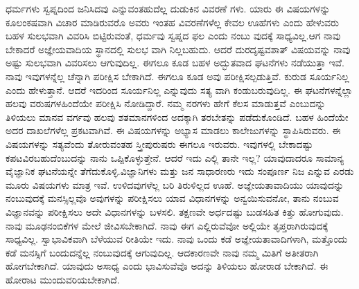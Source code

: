 ಧರ್ಮಗಳು ಸ್ವಪ್ನದಿಂದ ಜನಿಸಿದವು ಎನ್ನುವಂತಹುದೆಲ್ಲ ದುಡುಕಿನ ವಿವರಣೆ ಗಳು. ಯಾರು ಈ ವಿಷಯಗಳನ್ನು ಕೂಲಂಕಷವಾಗಿ ವಿಚಾರ ಮಾಡಿರುವರೊ ಅವರು ಇಂತಹ ವಿವರಣೆಗಳೆಲ್ಲ ಕೇವಲ ಊಹೆಗಳು ಎಂದು ಹೇಳುವರು ಬಹಳ ಸುಲಭವಾಗಿ ವಿವರಿಸಿ ಬಿಟ್ಟಿರುವಂತೆ, ಧರ್ಮವು ಸ್ವಪ್ನದ ಫಲ ಎಂದು ನಂಬು ವುದಕ್ಕೆ ಸಾಧ್ಯವಿಲ್ಲ.ಆಗ ನಾವು ಬೇಕಾದರೆ ಅಜ್ಞೇಯವಾದಿಯ ಸ್ಥಾನದಲ್ಲಿ ಸುಲಭ ವಾಗಿ ನಿಲ್ಲಬಹುದು. ಆದರೆ ದುರದೃಷ್ಟವಶಾತ್​ ವಿಷಯವನ್ನು ನಾವು ಅಷ್ಟು ಸುಲಭವಾಗಿ ವಿವರಿಸಲು ಆಗುವುದಿಲ್ಲ. ಈಗಲೂ ಕೂಡ ಬಹಳ ಅದ್ಭುತವಾದ ಘಟನೆಗಳು ನಡೆಯುತ್ತಾ ಇವೆ. ನಾವು ಇವುಗಳನ್ನೆಲ್ಲ ಚೆನ್ನಾಗಿ ಪರೀಕ್ಷಿಸ ಬೇಕಾಗಿದೆ. ಈಗಲೂ ಕೂಡ ಅವು ಪರೀಕ್ಷಿಸಲ್ಪಡುತ್ತಿವೆ. ಕುರುಡ ಸೂರ್ಯನಿಲ್ಲ ಎಂದು ಹೇಳುತ್ತಾನೆ. ಆದರೆ ಇದರಿಂದ ಸೂರ್ಯನಿಲ್ಲ ಎನ್ನುವುದು ಸತ್ಯ ವಾಗಿ ಕಂಡುಬರುವುದಿಲ್ಲ. ಈ ಘಟನೆಗಳನ್ನೆಲ್ಲಾ ಹಲವು ವರುಷಗಳಹಿಂದೆಯೇ ಪರೀಕ್ಷಿಸಿ ನೋಡಿದ್ದಾರೆ. ನಮ್ಮ ನರಗಳು ಹೇಗೆ ಕೆಲಸ ಮಾಡುತ್ತವೆ ಎಂಬುದನ್ನು ತಿಳಿಯಲು ಮಾನವ ವರ್ಗವು ಹಲವು ಶತಮಾನಗಳಿಂದ ಅದಕ್ಕಾಗಿ ತರಬೇತನ್ನು ಪಡೆದುಕೊಂಡಿದೆ. ಬಹಳ ಹಿಂದೆಯೇ ಅದರ ದಾಖಲೆಗಳೆಲ್ಲ ಪ್ರಕಟವಾಗಿವೆ. ಈ ವಿಷಯಗಳನ್ನು ಅಭ್ಯಾಸ ಮಾಡಲು ಕಾಲೇಜುಗಳನ್ನು ಸ್ಥಾಪಿಸಿರುವರು. ಈ ವಿಷಯಗಳನ್ನು ಸತ್ಯವೆಂದು ತೋರುವಂತಹ ಸ್ತ್ರೀಪುರುಷರು ಈಗಲೂ ಇರುವರು. ಇವುಗಳಲ್ಲಿ ಬೇಕಾದಷ್ಟು ಕಪಟವಿರಬಹುದೆಂಬುದನ್ನು ನಾನು ಒಪ್ಪಿಕೊಳ್ಳುತ್ತೇನೆ. ಆದರೆ ಇದು ಎಲ್ಲಿ ತಾನೇ ಇಲ್ಲ? ಯಾವುದಾದರೂ ಸಾಮಾನ್ಯ ವೈಜ್ಞಾನಿಕ ಘಟನೆಯನ್ನೇ ತೆಗೆದುಕೊಳ್ಳಿ.ವಿಜ್ಞಾನಿಗಳು ಮತ್ತು ಜನ ಸಾಧಾರಣರು ಇದು ಸಂಪೂರ್ಣ ನಿಜ ಎನ್ನುವ ಎರಡು ಮೂರು ವಿಷಯಗಳು ಮಾತ್ರ ಇವೆ. ಉಳಿದವುಗಳೆಲ್ಲ ಬರಿ ತಿರುಳಿಲ್ಲದ ಊಹೆ. ಅಜ್ಞೇಯತಾವಾದಿಯು ಯಾವುದನ್ನು ನಂಬುವುದಕ್ಕೆ ಮನಸ್ಸಿಲ್ಲವೊ ಅವುಗಳನ್ನು ಪರೀಕ್ಷಿಸಲು ಯಾವ ವಿಧಾನಗಳನ್ನು ಅನ್ವಯಿಸುವನೋ, ತಾನು ನಂಬುವ ವಿಜ್ಞಾನವನ್ನು ಪರೀಕ್ಷಿಸಲು ಅದೇ ವಿಧಾನಗಳನ್ನು ಬಳಸಲಿ. ತಕ್ಷಣವೇ ಅರ್ಧದಷ್ಟು ಬುಡಸಹಿತ ಕಿತ್ತು ಹೋಗುವುದು. ನಾವು ಮೂಢನಂಬಿಕೆಗಳ ಮೇಲೆ ಜೀವಿಸಬೇಕಾಗಿದೆ. ನಾವು ಈಗ ಎಲ್ಲಿರುವೆವೋ ಅಲ್ಲಿಯೇ ತೃಪ್ತರಾಗಿರುವುದಕ್ಕೆ ಸಾಧ್ಯವಿಲ್ಲ. ಸ್ವಾಭಾವಿಕವಾಗಿ ಬೆಳೆಯುವ ರೀತಿಯೇ ಇದು. ನಾವು ಒಂದು ಕಡೆ ಅಜ್ಞೇಯತಾವಾದಿಗಳಾಗಿ, ಮತ್ತೊಂದು ಕಡೆ ಮನಸ್ಸಿಗೆ ಬಂದುದನ್ನೆಲ್ಲ ನಂಬುವುದಕ್ಕೆ ಆಗುವುದಿಲ್ಲ. ಆದಕಾರಣವೇ ನಾವು ನಮ್ಮ ಮಿತಿಗೆ ಅತೀತರಾಗಿ ಹೋಗಬೇಕಾಗಿದೆ. ಯಾವುದು ಅಸಾಧ್ಯ ಎಂದು ಭಾವಿಸುವೆವೊ ಅದನ್ನು ತಿಳಿಯಲು ಹೋರಾಡ ಬೇಕಾಗಿದೆ. ಈ ಹೋರಾಟ ಮುಂದುವರಿಯಬೇಕಾಗಿದೆ.

